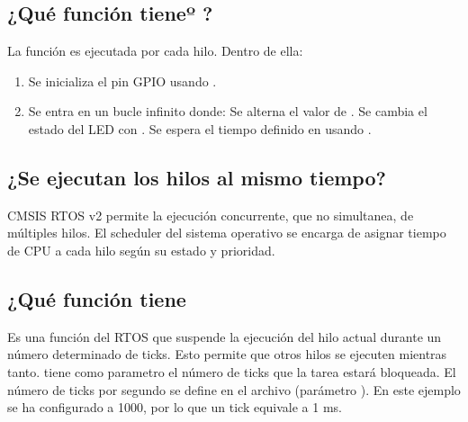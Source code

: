 \documentclass[letterpaper,10pt,english]{sphinxmanual}
\begin{document}
\subsection{¿Qué función tieneº ?}
\label{\detokenize{ejemplothreads:que-funcion-tieneo-thread}}
\sphinxAtStartPar
La función  es ejecutada por cada hilo. Dentro de ella:
\begin{enumerate}
%
\item {} 
\sphinxAtStartPar
Se inicializa el pin GPIO usando .

\item {} 
\sphinxAtStartPar
Se entra en un bucle infinito donde:
\sphinxhyphen{} Se alterna el valor de .
\sphinxhyphen{} Se cambia el estado del LED con .
\sphinxhyphen{} Se espera el tiempo definido en  usando .

\end{enumerate}


\subsection{¿Se ejecutan los hilos al mismo tiempo?}
\label{\detokenize{ejemplothreads:se-ejecutan-los-hilos-al-mismo-tiempo}}
\sphinxAtStartPar
CMSIS RTOS v2 permite la ejecución concurrente, que no simultanea, de múltiples hilos. El scheduler del sistema operativo se encarga de asignar tiempo de CPU a cada hilo según su estado y prioridad.


\subsection{¿Qué función tiene }
\label{\detokenize{ejemplothreads:que-funcion-tiene-osdelay}}
\sphinxAtStartPar
Es una función del RTOS que suspende la ejecución del hilo actual durante un número determinado de ticks. Esto permite que otros hilos se ejecuten mientras tanto.  tiene como parametro el número de ticks que la tarea estará bloqueada. El número de ticks por segundo se define en el archivo  (parámetro ). En este ejemplo se ha configurado a 1000, por lo que un tick equivale a 1 ms.
\end{document}

